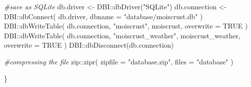 \documentclass[
  table]{article}
\newenvironment{Shaded}{\begin{snugshade}}{\end{snugshade}}
\newcommand{\AttributeTok}[1]{\textcolor[rgb]{0.77,0.63,0.00}{#1}}
\newcommand{\CommentTok}[1]{\textcolor[rgb]{0.56,0.35,0.01}{\textit{#1}}}
\newcommand{\ConstantTok}[1]{\textcolor[rgb]{0.00,0.00,0.00}{#1}}
\newcommand{\FunctionTok}[1]{\textcolor[rgb]{0.00,0.00,0.00}{#1}}
\newcommand{\NormalTok}[1]{#1}
\newcommand{\OtherTok}[1]{\textcolor[rgb]{0.56,0.35,0.01}{#1}}
\newcommand{\SpecialCharTok}[1]{\textcolor[rgb]{0.00,0.00,0.00}{#1}}
\newcommand{\StringTok}[1]{\textcolor[rgb]{0.31,0.60,0.02}{#1}}
\begin{document}
\begin{Shaded}
\begin{Highlighting}[]
  \CommentTok{\#save as SQLite}
\NormalTok{  db.driver }\OtherTok{\textless{}{-}}\NormalTok{ DBI}\SpecialCharTok{::}\FunctionTok{dbDriver}\NormalTok{(}\StringTok{"SQLite"}\NormalTok{)}
\NormalTok{  db.connection }\OtherTok{\textless{}{-}}\NormalTok{ DBI}\SpecialCharTok{::}\FunctionTok{dbConnect}\NormalTok{(}
\NormalTok{    db.driver, }
    \AttributeTok{dbname =} \StringTok{"database/moiscrust.db"}
\NormalTok{    )}
\NormalTok{  DBI}\SpecialCharTok{::}\FunctionTok{dbWriteTable}\NormalTok{(}
\NormalTok{    db.connection, }
    \StringTok{"moiscrust"}\NormalTok{, }
\NormalTok{    moiscrust, }
    \AttributeTok{overwrite =} \ConstantTok{TRUE}
\NormalTok{    )}
\NormalTok{    DBI}\SpecialCharTok{::}\FunctionTok{dbWriteTable}\NormalTok{(}
\NormalTok{    db.connection, }
    \StringTok{"moiscrust\_weather"}\NormalTok{, }
\NormalTok{    moiscrust\_weather, }
    \AttributeTok{overwrite =} \ConstantTok{TRUE}
\NormalTok{    )}
\NormalTok{  DBI}\SpecialCharTok{::}\FunctionTok{dbDisconnect}\NormalTok{(db.connection)}
  
  \CommentTok{\#compressing the file}
\NormalTok{  zip}\SpecialCharTok{::}\FunctionTok{zipr}\NormalTok{(}
    \AttributeTok{zipfile =} \StringTok{"database.zip"}\NormalTok{,}
    \AttributeTok{files =} \StringTok{"database"}
\NormalTok{  )}
  
\NormalTok{\}}
\end{Highlighting}
\end{Shaded}
\end{document}
